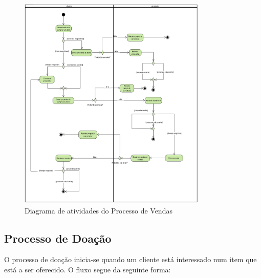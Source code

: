 \documentclass[a4paper, 12pt]{article} %
\begin{document}
\begin{figure}[ht]
	\centering
	\includegraphics[width=0.8\textwidth]{../images/activity-diagram-sales.png}
	\caption{Diagrama de atividades do Processo de Vendas}
	\label{fig:diagrama_atividades_vendas}
\end{figure}
\newpage
\clearpage

\subsection{Processo de Doação}
O processo de doação inicia-se quando um cliente está interessado num item que está a ser oferecido. O fluxo segue da seguinte forma:
\end{document}
